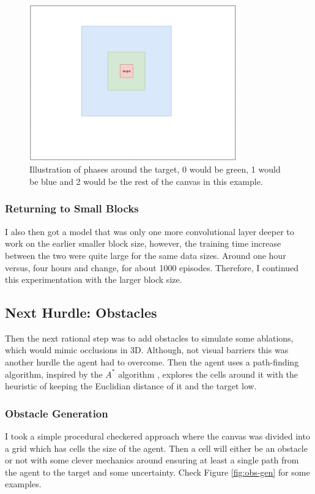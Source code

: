 \begin{figure}[h]
  \centering
  \includegraphics[width=0.8\textwidth]{assets/early-work/regions.png}
  \caption{Illustration of phases around the target, 0 would be green, 1 would be blue and 2 would be the rest of the canvas in this example. }\label{fig:phase-regions}
\end{figure}


\subsubsection{Returning to Small Blocks}
I also then got a model that was only one more convolutional layer deeper to work on the earlier smaller block size, however, the training time increase between the two were quite large for the same data sizes. Around one hour versus, four hours and change, for about 1000 episodes. Therefore, I continued this experimentation with the larger block size.


\subsection{Next Hurdle: Obstacles}
Then the next rational step was to add obstacles to simulate some ablations, which would mimic occlusions in 3D. Although, not visual barriers this was another hurdle the agent had to overcome.
Then the agent uses a path-finding algorithm, inspired by the $A^*$ algorithm \cite{cui2011based}, explores the cells around it with the heuristic of keeping the Euclidian distance of it and the target low.

\subsubsection{Obstacle Generation}
I took a simple procedural checkered approach where the canvas was divided into a grid which has cells the size of the agent. Then a cell will either be an obstacle or not with some clever mechanics around ensuring at least a single path from the agent to the target and some uncertainty. Check Figure \ref{fig:obs-gen} for some examples.

